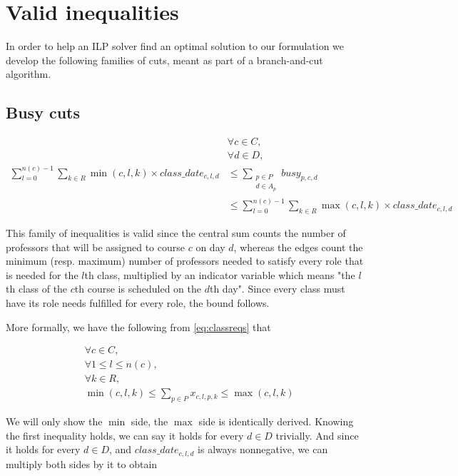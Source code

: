 \section{Valid inequalities}

In order to help an ILP solver find an optimal solution to our formulation we develop the following families of cuts, meant as part of a branch-and-cut algorithm.

\subsection{Busy cuts}

\begin{align}
&\forall c \in C,\\
&\forall d \in D,\\
\sum_{l = 0}^{n(c) - 1} \sum_{k \in R} \min(c, l, k) \times class\_date_{c, l, d} &\le \sum_{\substack{p \in P\\d \in A_p}} busy_{p, c, d} \\  &\le \sum_{l = 0}^{n(c) - 1} \sum_{k \in R} \max(c, l, k) \times class\_date_{c, l, d}
\end{align}

This family of inequalities is valid since the central sum counts the number of professors that will be assigned to course $c$ on day $d$, whereas the edges count the minimum (resp. maximum) number of professors needed to satisfy every role that is needed for the $l$th class, multiplied by an indicator variable which means "the $l$th class of the $c$th course is scheduled on the $d$th day". Since every class must have its role needs fulfilled for every role, the bound follows.

More formally, we have the following from \ref{eq:classreqs} that

\begin{align*}
&\forall c \in C,\\
&\forall 1 \le l \le n(c),\\
&\forall k \in R,\\
&\min(c, l, k) \le \sum_{p \in P} x_{c, l, p, k} \le \max(c, l, k)
\end{align*}

We will only show the $\min$ side, the $\max$ side is identically derived. Knowing the first inequality holds, we can say it holds for every $d \in D$ trivially. And since it holds for every $d \in D$, and $class\_date_{c, l, d}$ is always nonnegative, we can multiply both sides by it to obtain

